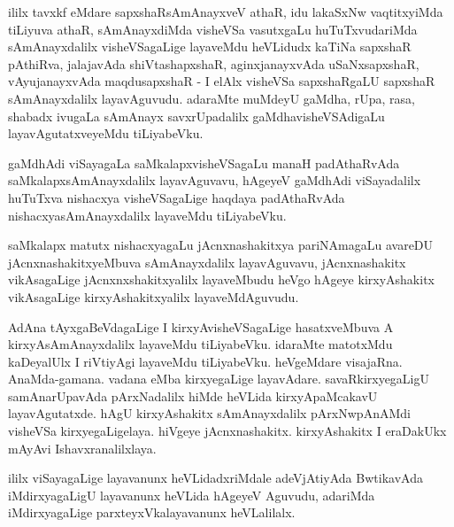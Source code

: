 \begin{artha}
ililx tavxkf eMdare sapxshaRsAmAnayxveV athaR, idu lakaSxNw
vaqtitxyiMda tiLiyuva athaR, sAmAnayxdiMda visheVSa vasutxgaLu
huTuTxvudariMda sAmAnayxdalilx visheVSagaLige layaveMdu heVLidudx
kaTiNa sapxshaR pAthiRva, jalajavAda shiVtashapxshaR, aginxjanayxvAda
uSaNxsapxshaR, vAyujanayxvAda maqdusapxshaR - I elAlx visheVSa
sapxshaRgaLU sapxshaR sAmAnayxdalilx layavAguvudu. adaraMte muMdeyU
gaMdha, rUpa, rasa, shabadx ivugaLa sAmAnayx savxrUpadalilx
gaMdhavisheVSAdigaLu layavAgutatxveyeMdu tiLiyabeVku.
\end{artha}

\begin{artha}
gaMdhAdi viSayagaLa saMkalapxvisheVSagaLu manaH padAthaRvAda
saMkalapxsAmAnayx\-dalilx layavAguvavu, hAgeyeV gaMdhAdi viSayadalilx
huTuTxva nishacxya visheVSa\-gaLige haqdaya padAthaRvAda
nishacxyasAmAnayxdalilx layaveMdu tiLiyabeVku.
\end{artha}

\begin{artha}
saMkalapx matutx nishacxyagaLu jAcnxnashakitxya pariNAmagaLu avareDU
jAcnxnashakitx\-yeMbuva sAmAnayxdalilx layavAguvavu, jAcnxnashakitx
vikAsagaLige jAcnxnxshakitxyalilx laya\-veMbudu heVgo hAgeye
kirxyAshakitx vikAsagaLige kirxyAshakitxyalilx \-layaveMdAguvudu.
\end{artha}

\begin{artha}
AdAna tAyxgaBeVdagaLige I kirxyAvisheVSagaLige hasatxveMbuva A
kirxyAsAmAnayx\-dalilx layaveMdu tiLiyabeVku. idaraMte matotxMdu
kaDeyalUlx I riVtiyAgi layaveMdu tiLiyabeVku. heVgeMdare
visajaRna. AnaMda-gamana. vadana eMba kirxyegaLige
layavAdare. savaRkirxyegaLigU samAnarUpavAda pArxNadalilx hiMde heVLida kirxyApaMcakavU layavAgutatxde. hAgU
kirxyAshakitx sAmAnayxdalilx pArxNw\-pAnAMdi visheVSa
kirxyegaLigelaya. hiVgeye jAcnxnashakitx. kirxyAshakitx I eraDakUkx
mAyAvi Ishavxranalilxlaya.

ililx viSayagaLige layavanunx heVLidadxriMdale adeVjAtiyAda
BwtikavAda iMdirxyagaLigU layavanunx heVLida hAgeyeV Aguvudu, adariMda
iMdirxya\-gaLige parxteyxVkalayavanunx heVLalilalx.
\end{artha}

